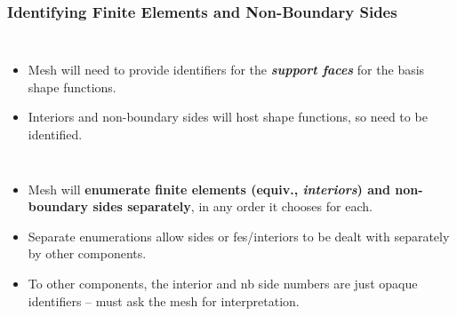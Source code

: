 \documentclass[compress]{beamer}
\begin{document}
\begin{frame}
  \frametitle{Identifying Finite Elements and Non-Boundary Sides}
  \begin{columns}
      \begin{itemize}[<+->]
        \item Mesh will need to provide identifiers for the \emph{\textbf{support faces}} for the basis shape functions.
        \item Interiors and non-boundary sides will host shape functions, so need to be identified.
      \end{itemize}
       {}
               {}
  \end{columns}
  \begin{itemize}[<+->]
    \item Mesh will \textbf{enumerate finite elements (equiv., \emph{interiors}) and non-boundary sides separately}, in any order it chooses for each.
    \item Separate enumerations allow sides or fes/interiors to be dealt with separately by other components.
    \item To other components, the interior and nb side numbers are just opaque identifiers -- must ask the mesh for interpretation.
  \end{itemize}
\end{frame}
 
\end{document}
